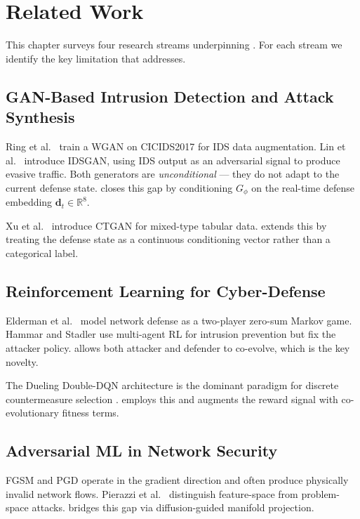 \chapter{Related Work}
\label{ch:related}

This chapter surveys four research streams underpinning \caesar{}.
For each stream we identify the key limitation that \caesar{} addresses.

\section{GAN-Based Intrusion Detection and Attack Synthesis}

Ring et al.\ \cite{ring2019} train a WGAN on CICIDS2017 for IDS data
augmentation. Lin et al.\ \cite{lin2018} introduce IDSGAN, using IDS
output as an adversarial signal to produce evasive traffic. Both
generators are \emph{unconditional} — they do not adapt to the current
defense state. \tagan{} closes this gap by conditioning $G_\phi$ on the
real-time defense embedding $\mathbf{d}_t \in \mathbb{R}^8$.

Xu et al.\ \cite{xu2019} introduce CTGAN for mixed-type tabular data.
\caesar{} extends this by treating the defense state as a continuous
conditioning vector rather than a categorical label.

\section{Reinforcement Learning for Cyber-Defense}

Elderman et al.\ \cite{elderman2017} model network defense as a
two-player zero-sum Markov game. Hammar and Stadler \cite{hammar2021}
use multi-agent RL for intrusion prevention but fix the attacker policy.
\caesar{} allows both attacker and defender to co-evolve, which is the
key novelty.

The Dueling Double-DQN architecture \cite{wang2016,hasselt2016} is the
dominant paradigm for discrete countermeasure selection
\cite{nguyen2021}. \adpn{} employs this and augments the reward signal
with co-evolutionary fitness terms.

\section{Adversarial ML in Network Security}

FGSM \cite{goodfellow2014b} and PGD \cite{madry2018} operate in the
gradient direction and often produce physically invalid network flows.
Pierazzi et al.\ \cite{pierazzi2020} distinguish feature-space from
problem-space attacks. \mgae{} bridges this gap via diffusion-guided
manifold projection.

